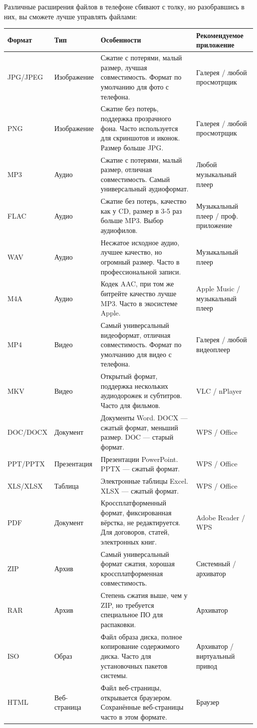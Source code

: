 
Различные расширения файлов в телефоне сбивают с толку, но разобравшись в них, вы сможете лучше управлять файлами:

\begin{center}
\begin{tabularx}{\linewidth}{|X|X|X|X|}
\hline
\textbf{Формат} & \textbf{Тип} & \textbf{Особенности} & \textbf{Рекомендуемое приложение} \tabularnewline
\hline
JPG/JPEG & Изображение & Сжатие с потерями, малый размер, лучшая совместимость. Формат по умолчанию для фото с телефона. & Галерея / любой просмотрщик \tabularnewline
PNG & Изображение & Сжатие без потерь, поддержка прозрачного фона. Часто используется для скриншотов и иконок. Размер больше JPG. & Галерея / любой просмотрщик \tabularnewline
MP3 & Аудио & Сжатие с потерями, малый размер, отличная совместимость. Самый универсальный аудиоформат. & Любой музыкальный плеер \tabularnewline
FLAC & Аудио & Сжатие без потерь, качество как у CD, размер в 3-5 раз больше MP3. Выбор аудиофилов. & Музыкальный плеер / проф. приложение \tabularnewline
WAV & Аудио & Несжатое исходное аудио, лучшее качество, но огромный размер. Часто в профессиональной записи. & Музыкальный плеер \tabularnewline
M4A & Аудио & Кодек AAC, при том же битрейте качество лучше MP3. Часто в экосистеме Apple. & Apple Music / музыкальный плеер \tabularnewline
MP4 & Видео & Самый универсальный видеоформат, отличная совместимость. Формат по умолчанию для видео с телефона. & Галерея / любой видеоплеер \tabularnewline
MKV & Видео & Открытый формат, поддержка нескольких аудиодорожек и субтитров. Часто для фильмов. & VLC / nPlayer \tabularnewline
DOC/DOCX & Документ & Документы Word. DOCX — сжатый формат, меньший размер. DOC — старый формат. & WPS / Office \tabularnewline
PPT/PPTX & Презентация & Презентации PowerPoint. PPTX — сжатый формат. & WPS / Office \tabularnewline
XLS/XLSX & Таблица & Электронные таблицы Excel. XLSX — сжатый формат. & WPS / Office \tabularnewline
PDF & Документ & Кроссплатформенный формат, фиксированная вёрстка, не редактируется. Для договоров, статей, электронных книг. & Adobe Reader / WPS \tabularnewline
ZIP & Архив & Самый универсальный формат сжатия, хорошая кроссплатформенная совместимость. & Системный / архиватор \tabularnewline
RAR & Архив & Степень сжатия выше, чем у ZIP, но требуется специальное ПО для распаковки. & Архиватор \tabularnewline
ISO & Образ & Файл образа диска, полное копирование содержимого диска. Часто для установочных пакетов системы. & Архиватор / виртуальный привод \tabularnewline
HTML & Веб-страница & Файл веб-страницы, открывается браузером. Сохранённые веб-страницы часто в этом формате. & Браузер \tabularnewline
\hline
\end{tabularx}
\end{center}

